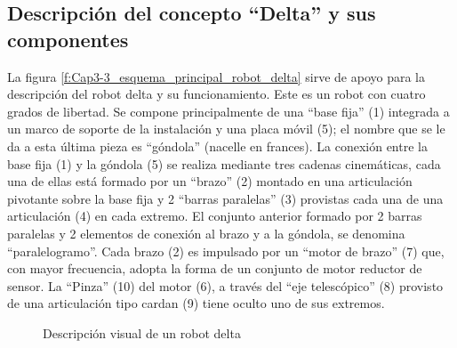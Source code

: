     
        \newpage
    
    \subsection{Descripción del concepto ``Delta'' y sus componentes}
    La figura \eqref{f:Cap3-3_esquema_principal_robot_delta} sirve de apoyo para la descripción del robot delta y su funcionamiento. Este es un robot con cuatro grados de libertad. Se compone principalmente de una ``base fija'' (1) integrada a un marco de soporte de la instalación y una placa móvil (5); el nombre que se le da a esta última pieza es ``góndola'' (nacelle en frances). La conexión entre la base fija (1) y la góndola (5) se realiza mediante tres cadenas cinemáticas, cada una de ellas está formado por un ``brazo'' (2) montado en una articulación pivotante sobre la base fija y 2 ``barras paralelas'' (3) provistas cada una de una articulación (4) en cada extremo. El conjunto anterior formado por 2 barras paralelas y 2 elementos de conexión al brazo y a la góndola, se denomina ``paralelogramo''. Cada brazo (2) es impulsado por un ``motor de brazo'' (7) que, con mayor frecuencia, adopta la forma de un conjunto de motor reductor de sensor. La ``Pinza'' (10) del motor (6), a través del ``eje telescópico'' (8) provisto de una articulación tipo cardan (9) tiene oculto uno de sus extremos.

    \vspace{-1em}

    \begin{figure}[h]
         \centering
         \caption{Descripción visual de un robot delta \cite{Clavel:31403}}
    \end{figure}

